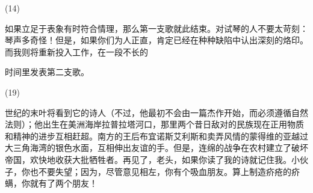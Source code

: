 \documentclass{article}
\begin{document}
(14) 

如果立足于表象有时符合情理，那么第一支歌就此结束。对试琴的人不要太苛刻：琴声多奇怪！但是，如果你们为人正直，肯定已经在种种缺陷中认出深刻的烙印。而我则将重新投入工作，在一段不长的

\newpage
时间里发表第二支歌。 


(19) 

世纪的末叶将看到它的诗人（不过，他最初不会由一篇杰作开始，而必须遵循自然法则）；他出生在美洲海岸拉普拉塔河口，那里两个昔日敌对的民族现在正用物质和精神的进步互相赶超。南方的王后布宜诺斯艾利斯和卖弄风情的蒙得维的亚越过大三角海湾的银色水面，互相伸出友谊的手。但是，连绵的战争在农村建立了破坏帝国，欢快地收获大批牺牲者。再见了，老头，如果你读了我的诗就记住我。小伙子，你也不要失望；因为，尽管意见相左，你有个吸血朋友。算上制造疥疮的疥螨，你就有了两个朋友！
\end{document}

